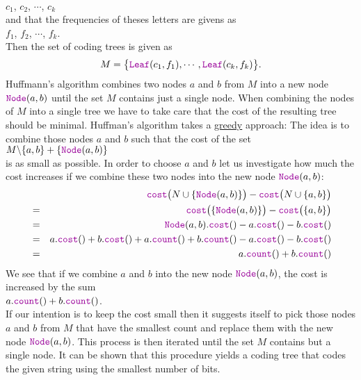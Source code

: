\\[0.2cm]
\hspace*{1.3cm}
$c_1$, $c_2$, $\cdots$, $c_k$
\\[0.2cm]
and that the frequencies of theses letters are givens as
\\[0.2cm]
\hspace*{1.3cm}
$f_1$, $f_2$, $\cdots$, $f_k$.
\\[0.2cm]
Then the set of coding trees is given as
\begin{equation}
  \label{eq:huffmann1}
 M = \bigl\{  \mytt{Leaf}(c_1, f_1), \cdots, \mytt{Leaf}(c_k, f_k) \bigr\}.   
\end{equation}
Huffmann's algorithm combines two nodes $a$ and $b$ from $M$ into a new node
$\mytt{Node}(a,b)$ until the set $M$ contains just a single node.  When combining the nodes of $M$ into a single
tree we have to take care that the cost of the resulting tree should be minimal.
Huffman's algorithm takes a \href{https://en.wikipedia.org/wiki/Greedy_algorithm}{greedy} approach: 
The idea is to combine those nodes $a$ and $b$ such that the cost of the set
\\[0.2cm]
\hspace*{1.3cm}
$M \symbol{92} \{a,b\} + \{ \mytt{Node}(a,b) \}$
\\[0.2cm]
is as small as possible.
In order to choose $a$ and $b$ let us investigate how much the cost increases if we combine these two nodes
into the new node $\mytt{Node}(a,b)$:
\begin{eqnarray*}
& & \mytt{cost}\bigl(N \cup \{ \mytt{Node}(a,b) \}\bigr) - \mytt{cost}\bigl(N \cup \{ a,b \}\bigr) \\
&=& \mytt{cost}\bigl( \{ \mytt{Node}(a,b) \}\bigr) - \mytt{cost}\bigl(\{ a,b \}\bigr)              \\
&=& \mytt{Node}(a,b).\mytt{cost}() - a.\mytt{cost}() - b.\mytt{cost}()                           \\
&=&   a.\mytt{cost}() + b.\mytt{cost}() + a.\mytt{count}() + b.\mytt{count}() 
    - a.\mytt{cost}() - b.\mytt{cost}()                                                              \\
&=& a.\mytt{count}() + b.\mytt{count}() 
\end{eqnarray*}
We see that if we combine $a$ and $b$ into the new node $\mytt{Node}(a,b)$, the cost is increased by the sum 
\\[0.2cm]
\hspace*{1.3cm}
$a.\mytt{count}() + b.\mytt{count}()$. 
\\[0.2cm]
If our intention is to keep the cost small then it suggests itself to pick those nodes
$a$ and $b$ from $M$ that have the smallest count and replace them with the new node
$\mytt{Node}(a,b)$.  This process is then iterated until the set $M$ contains but a single node.
It can be shown that this procedure yields a coding tree that codes the given string using the smallest number
of bits. 

